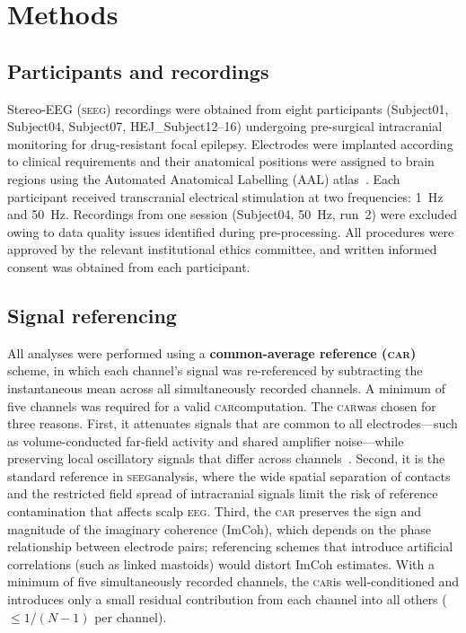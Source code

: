 \documentclass[11pt, a4paper]{article}
\newcommand{\seeg}{\textsc{seeg}}
\newcommand{\car}{\textsc{car}}
\begin{document}
\section{Methods}

\subsection{Participants and recordings}

Stereo-EEG (\seeg) recordings were obtained from eight participants
(Subject01, Subject04, Subject07, HEJ\_Subject12--16) undergoing
pre-surgical intracranial monitoring for drug-resistant focal epilepsy.
Electrodes were implanted according to clinical requirements and their
anatomical positions were assigned to brain regions using the Automated
Anatomical Labelling (AAL) atlas~\citep{tzourio2002automated}. Each
participant received transcranial electrical stimulation at two
frequencies: 1~Hz and 50~Hz. Recordings from one session
(Subject04, 50~Hz, run~2) were excluded owing to data quality issues
identified during pre-processing. All procedures were approved by the
relevant institutional ethics committee, and written informed consent was
obtained from each participant.

\subsection{Signal referencing}

All analyses were performed using a \textbf{common-average reference (\car)}
scheme, in which each channel's signal was re-referenced by subtracting the
instantaneous mean across all simultaneously recorded channels. A minimum of
five channels was required for a valid \car computation. The \car was chosen
for three reasons. First, it attenuates signals that are common to all
electrodes---such as volume-conducted far-field activity and shared
amplifier noise---while preserving local oscillatory signals that differ
across channels~\citep{nunez2006electric}. Second, it is the standard
reference in \seeg analysis, where the wide spatial separation of contacts
and the restricted field spread of intracranial signals limit the risk of
reference contamination that affects scalp \textsc{eeg}. Third, the \car
preserves the sign and magnitude of the imaginary coherence (ImCoh), which
depends on the phase relationship between electrode pairs; referencing
schemes that introduce artificial correlations (such as linked mastoids)
would distort ImCoh estimates. With a minimum of five simultaneously
recorded channels, the \car is well-conditioned and introduces only a small
residual contribution from each channel into all others
($\leq 1/(N-1)$ per channel).
\end{document}
